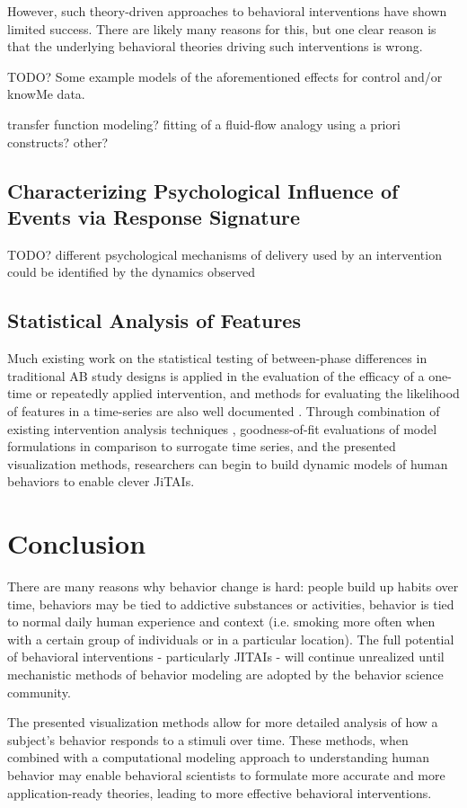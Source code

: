 \documentclass[review,journal]{vgtc}         %
\begin{document}
However, such theory-driven approaches to  behavioral interventions have shown limited success. 
There are likely many reasons for this, but one clear reason is that the underlying behavioral theories driving such interventions is wrong.



TODO? Some example models of the aforementioned effects for control and/or knowMe data.

transfer function modeling?
fitting of a fluid-flow analogy using a priori constructs?
other?

\subsection{Characterizing Psychological Influence of Events via Response Signature}
TODO? different psychological mechanisms of delivery used by an intervention could be identified by the dynamics observed

\subsection{Statistical Analysis of Features}
Much existing work on the statistical testing of between-phase differences in traditional AB study designs \cite{parker2003} is applied in the evaluation of the efficacy of a one-time or repeatedly applied intervention, and methods for evaluating the likelihood of features in a time-series are also well documented \cite{gorman1996, suen1989}.
Through combination of existing intervention analysis techniques \cite{box1975}, goodness-of-fit evaluations of model formulations \cite{pankratz2012} in comparison to surrogate time series, and the presented visualization methods, researchers can begin to build dynamic models of human behaviors to enable clever JiTAIs.

\section{Conclusion}
There are many reasons why behavior change is hard: people build up habits over time, behaviors may be tied to addictive substances or activities, behavior is tied to normal daily human experience and context (i.e. smoking more often when with a certain group of individuals or in a particular location).
The full potential of behavioral interventions - particularly JITAIs - will continue unrealized until mechanistic methods of behavior modeling are adopted by the behavior science community.

The presented visualization methods allow for more detailed analysis of how a subject’s behavior responds to a stimuli over time.
These methods, when combined with a computational modeling approach to understanding human behavior may enable behavioral scientists to formulate more accurate and more application-ready theories, leading to more effective behavioral interventions.




\end{document}
